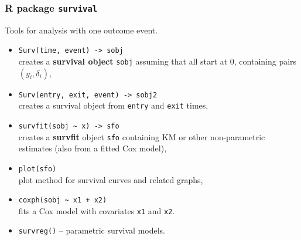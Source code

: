 \documentclass[handout,12pt,dvipsnames,t]{beamer}
\begin{document}
\begin{frame}[fragile]

\frametitle{R package \texttt{survival} }

Tools for analysis with one outcome event.

\begin{itemize}
\item 
\texttt{Surv(time, event) -> sobj} \\ 
creates a \textbf{survival object} \texttt{sobj} assuming that all start at 0, 
containing pairs $(y_i, \delta_i)$,
 \medskip
 \item
\texttt{Surv(entry, exit, event) -> sobj2} \\
 creates a survival object from
  \texttt{entry} and \texttt{exit} times, %
  \pause \medskip
\item 
\verb!survfit(sobj ~ x) -> sfo! \\
creates a \textbf{survfit} object {\tt sfo}
containing KM or other non-parametric estimates
(also from a fitted Cox model), 
 \pause  \medskip
\item 
\texttt{plot(sfo)} \\
 plot method for survival curves and related graphs, 
\pause
  \medskip
\item 
\verb|coxph(sobj ~ x1 + x2)| \\ 
fits a Cox model
with covariates \texttt{x1} and \texttt{x2}. 
\pause
    \medskip
\item 
\texttt{survreg()} -- parametric survival models.
\end{itemize}   

\end{frame}
\end{document}
